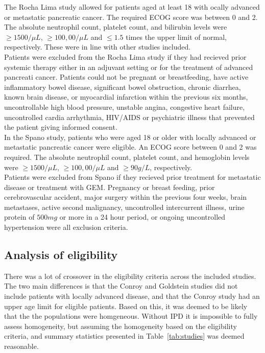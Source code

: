 The Rocha Lima study allowed for patients aged at least 18 with ocally advanced or metastatic pancreatic cancer. The required ECOG score was between 0 and 2. The absolute neutrophil count, platelet count, and bilirubin levels were $\geq 1500/\mu L$, $\geq 100,00/\mu L$ and $\leq 1.5$ times the upper limit of normal, respectively. These were in line with other studies included. \\

Patients were excluded from the Rocha Lima study if they had recieved prior systemic therapy either in an adjuvant setting or for the treatment of advanced pancreati cancer. Patients could not be pregnant or breastfeeding, have active inflammatory bowel disease, significant bowel obstruction, chronic diarrhea, known brain disease, or myocardial infarction within the previous six months, uncontrollable high blood pressure, unstable angina, congestive heart failure, uncontrolled cardia arrhythmia, HIV/AIDS or psychiatric illness that prevented the patient giving informed consent. \\

In the Spano study, patients who were aged 18 or older with locally advanced or metastatic pancreatic cancer were eligible. An ECOG score between 0 and 2 was required. The absolute neutrophil count, platelet count, and hemoglobin levels were $\geq 1500/\mu L$, $\geq 100,00/\mu L$ and $\geq 90g/L$, respectively. \\

Patients were excluded from Spano if they recieved prior treatment for metastatic disease or treatment with GEM. Pregnancy or breast feeding, prior cerebrovascular accident, major surgery within the previous four weeks, brain metastases, active second malignancy, uncontrolled intercurrent illness, urine protein of $500mg$ or more in a 24 hour period, or ongoing uncontrolled hypertension were all exclusion criteria.

\subsection{Analysis of eligibility}
There was a lot of crossover in the eligibility criteria across the included studies. The two main differences is that the Conroy and Goldstein studies did not include patients with locally advanced disease, and that the Conroy study had an upper age limit for eligible patients. Based on this, it was deemed to be likely that the the populations were homgeneous. Without IPD it is impossible to fully assess homogeneity, but assuming the homogeneity based on the eligibility criteria, and summary statistics presented in Table~\ref{tab:studies} was deemed reasonable.


